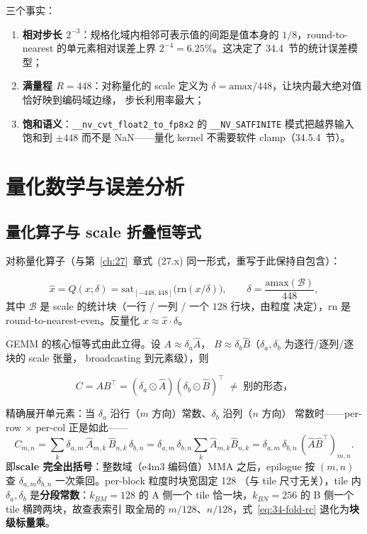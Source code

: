 三个事实：
\begin{enumerate}[itemsep=0pt,topsep=2pt]
  \item \textbf{相对步长 $2^{-3}$}：规格化域内相邻可表示值的间距是值本身的
        $1/8$，round-to-nearest 的单元素相对误差上界 $2^{-4}=6.25\%$。这决定了
        34.4~节的统计误差模型；
  \item \textbf{满量程 $R=448$}：对称量化的 scale 定义为
        $\delta = \mathrm{amax}/448$，让块内最大绝对值恰好映到编码域边缘，
        步长利用率最大；
  \item \textbf{饱和语义}：\texttt{\_\_nv\_cvt\_float2\_to\_fp8x2} 的
        \texttt{\_\_NV\_SATFINITE} 模式把越界输入饱和到 $\pm448$ 而不是
        NaN——量化 kernel 不需要软件 clamp（34.5.4~节）。
\end{enumerate}

\section{量化数学与误差分析}\label{sec:34-math}

\subsection{量化算子与 scale 折叠恒等式}

对称量化算子（与第~\ref{ch:27}~章式~(27.x) 同一形式，重写于此保持自包含）：

\begin{equation}
  \hat{x} = Q(x;\delta) = \mathrm{sat}_{[-448,448]}\!\big(\mathrm{rn}(x/\delta)\big),
  \qquad \delta = \frac{\mathrm{amax}(\mathcal{B})}{448},
  \label{eq:34-quant-op}
\end{equation}
其中 $\mathcal{B}$ 是 scale 的统计块（一行 / 一列 / 一个 $128$ 行块，由粒度
决定），$\mathrm{rn}$ 是 round-to-nearest-even。反量化 $x \approx \hat{x}\cdot\delta$。

GEMM 的核心恒等式由此立得。设 $A \approx \delta_a \hat{A}$，
$B \approx \delta_b \hat{B}$（$\delta_a,\delta_b$ 为逐行/逐列/逐块的 scale
张量， broadcasting 到元素级），则

\begin{equation}
  C = A B^{\top} = (\delta_a \odot \hat{A})(\delta_b \odot \hat{B})^{\top}
    \;\neq\; \text{别的形态，}
  \label{eq:34-fold}
\end{equation}

精确展开单元素：当 $\delta_a$ 沿行（$m$ 方向）常数、$\delta_b$ 沿列（$n$ 方向）
常数时——per-row $\times$ per-col 正是如此——
\begin{equation}
  C_{m,n} = \sum_{k} \delta_{a,m}\,\hat{A}_{m,k}\,\hat{B}_{n,k}\,\delta_{b,n}
          = \delta_{a,m}\,\delta_{b,n} \sum_k \hat{A}_{m,k}\hat{B}_{n,k}
          = \delta_{a,m}\,\delta_{b,n}\,(\hat{A}\hat{B}^{\top})_{m,n}.
  \label{eq:34-fold-rc}
\end{equation}
即\textbf{scale 完全出括号}：整数域（e4m3 编码值）MMA 之后，epilogue 按
$(m,n)$ 查 $\delta_{a,m}\delta_{b,n}$ 一次乘回。per-block 粒度时块宽固定 128
（与 tile 尺寸无关），tile 内 $\delta_a,\delta_b$ 是\textbf{分段常数}：$k_{BM}{=}128$
的 A 侧一个 tile 恰一块，$k_{BN}{=}256$ 的 B 侧一个 tile 横跨两块，故查表索引
取全局的 $m/128$、$n/128$，式~\ref{eq:34-fold-rc} 退化为\textbf{块级标量乘}。


